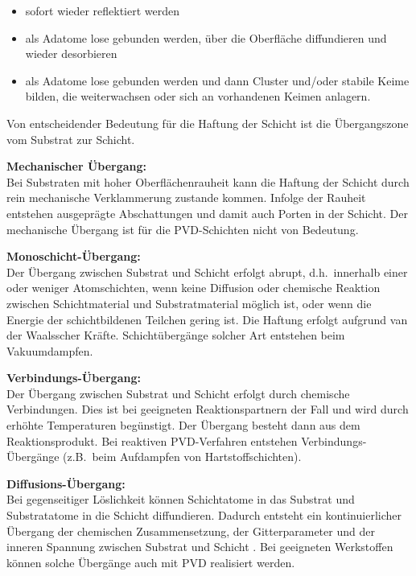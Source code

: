 \documentclass[12pt,a4paper,bibliography=totocnumbered,listof=totocnumbered,fleqn]{scrartcl}
\begin{document}
\begin{itemize}
	\item sofort wieder reflektiert werden
	\item als Adatome lose gebunden werden, über die Oberfläche diffundieren und wieder desorbieren
	\item als Adatome lose gebunden werden und dann Cluster und/oder stabile Keime bilden, die weiterwachsen oder sich an vorhandenen Keimen anlagern.
\end{itemize}

Von entscheidender Bedeutung für die Haftung der Schicht ist die Übergangszone vom Substrat zur Schicht.


\textbf{Mechanischer Übergang:}\\
Bei Substraten mit hoher Oberflächenrauheit kann die Haftung der Schicht durch rein mechanische Verklammerung zustande kommen.
Infolge der Rauheit entstehen ausgeprägte Abschattungen und damit auch Porten in der Schicht.
Der mechanische Übergang ist für die PVD-Schichten nicht von Bedeutung.

\textbf{Monoschicht-Übergang:}\\
Der Übergang zwischen Substrat und Schicht erfolgt abrupt, d.h.\ innerhalb einer oder weniger Atomschichten, wenn keine Diffusion oder chemische Reaktion zwischen Schichtmaterial und Substratmaterial möglich ist,  oder wenn die Energie der schichtbildenen Teilchen gering ist.
Die Haftung erfolgt aufgrund van der Waalsscher Kräfte.
Schichtübergänge solcher Art entstehen beim Vakuumdampfen.

\textbf{Verbindungs-Übergang:}\\
Der Übergang zwischen Substrat und Schicht erfolgt durch chemische Verbindungen.
Dies ist bei geeigneten Reaktionspartnern der Fall und wird durch erhöhte Temperaturen begünstigt.
Der Übergang besteht dann aus dem Reaktionsprodukt.
Bei reaktiven PVD-Verfahren entstehen Verbindungs-Übergänge (z.B.\ beim Aufdampfen von Hartstoffschichten).

\textbf{Diffusions-Übergang:}\\
Bei gegenseitiger Löslichkeit können Schichtatome in das Substrat und Substratatome in die Schicht diffundieren.
Dadurch entsteht ein kontinuierlicher Übergang der chemischen Zusammensetzung, der Gitterparameter und der inneren Spannung zwischen Substrat und Schicht \citep{bach2005moderne}.
Bei geeigneten Werkstoffen können solche Übergänge auch mit PVD realisiert werden.
\end{document}
